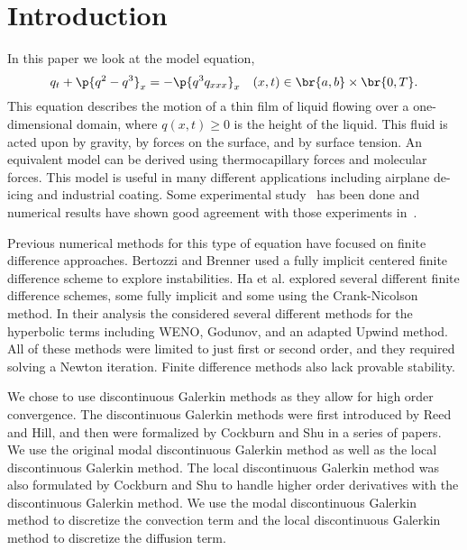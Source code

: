 \chapter{Introduction}

In this paper we look at the model equation,
\begin{equation}
  q_t + \p{q^2 - q^3}_x = -\p{q^3 q_{xxx}}_x \quad (x, t) \in \br{a, b} \times \br{0, T}. \label{eq:thin_film_model}
\end{equation}
This equation describes the motion of a thin film of liquid flowing over a one-dimensional domain,
where \(q(x, t) \ge 0\) is the height of the liquid.
This fluid is acted upon by gravity, by forces on the surface, and by surface tension.
An equivalent model can be derived using thermocapillary forces and molecular forces.
This model is useful in many different applications including airplane de-icing\cite{}
and industrial coating.
Some experimental study~\cite{article:cazabat1990fingering,
article:kataoka1997theoretical, article:ludviksson1971dynamics} has been done and
numerical results have shown good agreement with those experiments
in~\cite{article:bertozzi1998contact}.

Previous numerical methods for this type of equation have focused on finite difference
approaches.
Bertozzi and Brenner\cite{bertozzi1997linear} used a fully implicit centered finite
difference scheme to explore instabilities.
Ha et al.\cite{article:Ha2008} explored several different finite difference schemes,
some fully implicit and some using the Crank-Nicolson method.
In their analysis the considered several different methods for the hyperbolic terms
including WENO, Godunov, and an adapted Upwind method.
All of these methods were limited to just first or second order, and they required
solving a Newton iteration.
Finite difference methods also lack provable stability.

We chose to use discontinuous Galerkin methods as they allow for high order
convergence.
The discontinuous Galerkin methods were first introduced by Reed and
Hill\cite{techreport:Reed1973}, and then were formalized by Cockburn and Shu
in a series of papers\cite{article:Cockburn1991I, article:Cockburn1989II,
article:Cockburn1989III, article:Cockburn1990IV, article:cockburn1998V}.
We use the original modal discontinuous Galerkin method as well as the local
discontinuous Galerkin method.
The local discontinuous Galerkin method was also formulated by Cockburn and
Shu\cite{article:Cockburn1998LDG} to handle higher order derivatives with the
discontinuous Galerkin method.
We use the modal discontinuous Galerkin method to discretize the convection term and
the local discontinuous Galerkin method to discretize the diffusion term.


